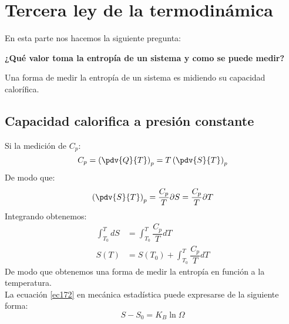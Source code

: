 \documentclass[../main]{subfiles}
\begin{document}
\chapter{Tercera ley de la termodinámica}

En esta parte nos hacemos la siguiente pregunta:

\begin{center}
    \textbf{¿Qué valor toma la entropía de un sistema y como se puede medir?}
\end{center}
Una forma de medir la entropía de un sistema es midiendo su capacidad calorífica.
\section{Capacidad calorifica a presión constante}
Si la medición de $C_p$:
\begin{equation}
    C_p=\left( \pdv{Q}{T}\right)_p=T\left( \pdv{S}{T}\right)_p
\end{equation}
De modo que:
\begin{equation}
    \left( \pdv{S}{T}\right)_p= \dfrac{C_p}{T} \\
    \partial S= \dfrac{C_p}{T}\partial T
\end{equation}
Integrando obtenemos:
\begin{align}
    \int_{T_0}^{T}dS & =\int_{T_0}^T \dfrac{C_p}{T}dT        \\
    S(T)             & =S(T_0)+\int_{T_0}^T \dfrac{C_p}{T}dT
    \label{ec172}
\end{align}
De modo que obtenemos una forma de medir la entropía en función a la temperatura. \\[0.3cm]
La ecuación \eqref{ec172} en mecánica estadística puede expresarse de la siguiente forma:
\begin{equation}
    S-S_0=K_B \ln{\Omega}
\end{equation}
\end{document}
